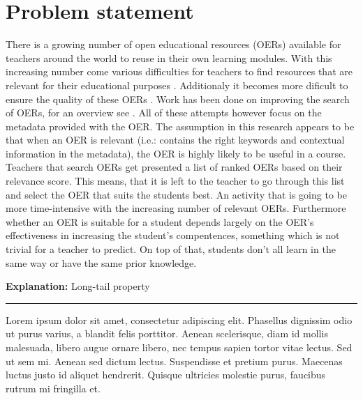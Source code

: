 \section{Problem statement}
There is a growing number of open educational resources (OERs) available for teachers around the world to reuse in their own learning modules. With this increasing number come various difficulties for teachers to find resources that are relevant for their educational purposes \citep{Ochoa2011}. Additionaly it becomes more dificult to ensure the quality of these OERs \citep{Cechinel2011}. Work has been done on improving the search of OERs, for an overview see \citep{Ochoa2008}. All of these attempts however focus on the metadata provided with the OER. The assumption in this research appears to be that when an OER is relevant (i.e.: contains the right keywords and contextual information in the metadata), the OER is highly likely to be useful in a course. Teachers that search OERs get presented a list of ranked OERs based on their relevance score. This means, that it is left to the teacher to go through this list and select the OER that suits the students best. An activity that is going to be more time-intensive with the increasing number of relevant OERs. Furthermore whether an OER is suitable for a student depends largely on the OER’s effectiveness in increasing the student’s compentences, something which is not trivial for a teacher to predict. On top of that, students don’t all learn in the same way or have the same prior knowledge.

\begin{shaded}
\textbf{{\large Explanation:}} Long-tail property \vspace{0.5\onelineskip} \hrule
\vspace{\baselineskip}
Lorem ipsum dolor sit amet, consectetur adipiscing elit. Phasellus dignissim odio ut purus varius, a blandit felis porttitor. Aenean scelerisque, diam id mollis malesuada, libero augue ornare libero, nec tempus sapien tortor vitae lectus. Sed ut sem mi. Aenean sed dictum lectus. Suspendisse et pretium purus. Maecenas luctus justo id aliquet hendrerit. Quisque ultricies molestie purus, faucibus rutrum mi fringilla et.
\end{shaded}

